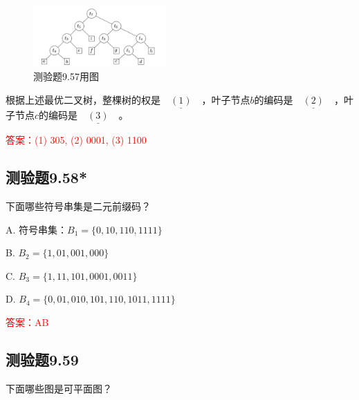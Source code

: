 \documentclass[UTF8, heading=true]{ctexart}
\begin{document}
\begin{figure}[H]
  \centering
  \includegraphics[width=0.45\textwidth]{9.57.jpg} %
  \caption{测验题9.57用图}
\end{figure}

根据上述最优二叉树，整棵树的权是$\underline{\quad (1) \quad}$，叶子节点$b$的编码是$\underline{\quad (2)\quad}$，叶子节点$c$的编码是$\underline{\quad (3)\quad}$。

\textcolor{red}{答案：(1) 305, (2) 0001, (3) 1100}

\subsection{测验题9.58*}

下面哪些符号串集是二元前缀码？

A. 符号串集：$B_1 =\{0,10,110,1111\}$

B. $B_2=\{1,01,001,000\}$

C. $B_3=\{1,11,101,0001,0011\}$

D. $B_4=\{0,01,010,101,110,1011,1111\}$

\textcolor{red}{答案：AB}

\subsection{测验题9.59}

下面哪些图是可平面图？
\end{document}
